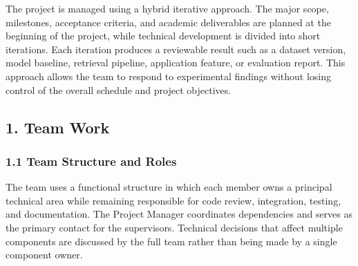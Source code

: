 \documentclass[11pt,a4paper]{article}
\begin{document}
The project is managed using a hybrid iterative approach. The major scope,
milestones, acceptance criteria, and academic deliverables are planned at the
beginning of the project, while technical development is divided into short
iterations. Each iteration produces a reviewable result such as a dataset
version, model baseline, retrieval pipeline, application feature, or evaluation
report. This approach allows the team to respond to experimental findings
without losing control of the overall schedule and project objectives.

\subsection{1. Team Work}

\subsubsection{1.1 Team Structure and Roles}

The team uses a functional structure in which each member owns a principal
technical area while remaining responsible for code review, integration,
testing, and documentation. The Project Manager coordinates dependencies and
serves as the primary contact for the supervisors. Technical decisions that
affect multiple components are discussed by the full team rather than being
made by a single component owner.
\end{document}

